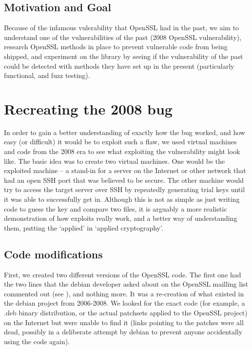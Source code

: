 \documentclass[conference]{IEEEtran}
\begin{document}
\subsection{Motivation and Goal}

Because of the infamous vulerability that OpenSSL had in the past,
we aim to understand one of the vulnerabilities
of the past (2008 OpenSSL vulnerability), research OpenSSL
methods in place to prevent vulnerable code from being
shipped, and experiment on the library by seeing if
the vulnerability of the past could be detected with methods
they have set up in the present (particularly functional, and fuzz testing).

\section{Recreating the 2008 bug}

In order to gain a better understanding of exactly how the bug worked,
and how easy (or difficult) it would be to exploit such a flaw, we
used virtual machines and code from the 2008 era to see what
exploiting the vulnerability might look like. The basic idea was to
create two virtual machines. One would be the exploited machine -- a
stand-in for a server on the Internet or other network that had an
open SSH port that was believed to be secure. The other machine would
try to access the target server over SSH by repeatedly generating
trial keys until it was able to successfully get in. Although this is
not as simple as just writing code to guess the key and compare two
files, it is arguably a more realistic demonstration of how exploits
really work, and a better way of understanding them, putting the
`applied' in `applied cryptography'.

\subsection{Code modifications}
First, we created two different versions of the OpenSSL code. The
first one had the two lines that the debian developer asked about on
the OpenSSL mailling list commented out (see \cite{4}), and nothing
more. It was a re-creation of what existed in the debian project from
2006-2008. We looked for the exact code (for example, a .deb binary
distribution, or the actual patchsets applied to the OpenSSL project)
on the Internet but were unable to find it (links pointing to the
patches were all dead, possibly in a deliberate attempt by debian to prevent
anyone accidentally using the code again).
\end{document}
